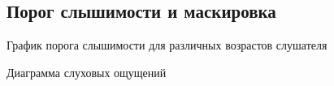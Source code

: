 \documentclass{beamer}
\begin{document}
\subsection{Порог слышимости и маскировка}
\begin{frame}
  \begin{block}{График порога слышимости для различных возрастов слушателя}
  \end{block}
\end{frame}

\begin{frame}
  \begin{block}{Диаграмма слуховых ощущений}
  \end{block}
\end{frame}
\end{document}
